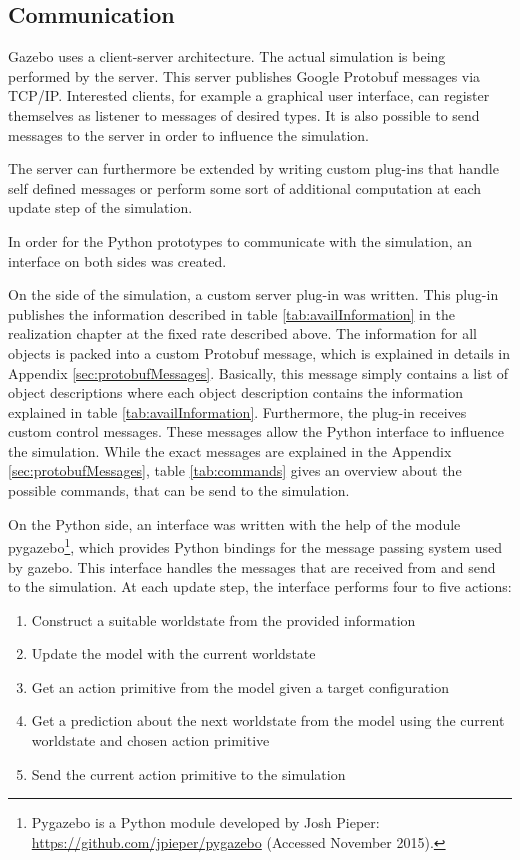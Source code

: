 \subsection{Communication}
Gazebo uses a client-server architecture. The actual simulation is being performed by the server.
This server publishes Google Protobuf \cite{protobuf} messages via TCP/IP. Interested clients, for example a graphical user interface, can register themselves as listener to messages of desired types. 
It is also possible to send messages to the server in order to influence the simulation. 

The server can furthermore be extended by writing custom plug-ins that handle self defined messages or perform some sort of additional computation at each update step of the simulation. 

In order for the Python prototypes to communicate with the simulation, an interface on both sides was created.

On the side of the simulation, a custom server plug-in was written. This plug-in publishes the information described in table \ref{tab:availInformation} in the realization chapter at the fixed rate described above. 
The information for all objects is packed into a custom Protobuf message, which is explained in details in Appendix \ref{sec:protobufMessages}. Basically, this message simply contains a list of object descriptions where each object description contains the information explained in table \ref{tab:availInformation}.
Furthermore, the plug-in receives custom control messages. These messages allow the Python interface to influence the simulation.
While the exact messages are explained in the Appendix \ref{sec:protobufMessages}, table \ref{tab:commands} gives an overview about the possible commands, that can be send to the simulation.

On the Python side, an interface was written with the help of the module  pygazebo\footnote{Pygazebo is a Python module developed by Josh Pieper: \url{https://github.com/jpieper/pygazebo} (Accessed November 2015).}, which provides Python bindings for the message passing system used by gazebo. This interface handles the messages that are received from and send to the simulation. 
At each update step, the interface performs four to five actions:
\begin{enumerate}
\item Construct a suitable worldstate from the provided information
\item Update the model with the current worldstate
\item Get an action primitive from the model given a target configuration
\item Get a prediction about the next worldstate from the model using the current worldstate and chosen action primitive
\item Send the current action primitive to the simulation
\end{enumerate}

